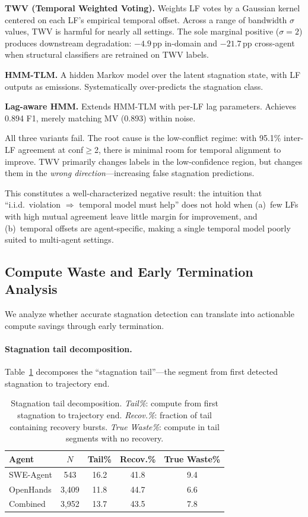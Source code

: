\documentclass[11pt,a4paper]{article}
\begin{document}
\textbf{TWV (Temporal Weighted Voting).} Weights LF votes by a Gaussian kernel centered on each LF's empirical temporal offset.
Across a range of bandwidth $\sigma$ values, TWV is harmful for nearly all settings.
The sole marginal positive ($\sigma{=}2$) produces downstream degradation: $-4.9$\,pp in-domain and $-21.7$\,pp cross-agent when structural classifiers are retrained on TWV labels.

\textbf{HMM-TLM.} A hidden Markov model over the latent stagnation state, with LF outputs as emissions.
Systematically over-predicts the stagnation class.

\textbf{Lag-aware HMM.} Extends HMM-TLM with per-LF lag parameters.
Achieves 0.894 F1, merely matching MV (0.893) within noise.

All three variants fail.
The root cause is the low-conflict regime: with 95.1\% inter-LF agreement at conf$\geq$2, there is minimal room for temporal alignment to improve.
TWV primarily changes labels in the low-confidence region, but changes them in the \emph{wrong direction}---increasing false stagnation predictions.

This constitutes a well-characterized negative result: the intuition that ``i.i.d.\ violation $\Rightarrow$ temporal model must help'' does not hold when (a)~few LFs with high mutual agreement leave little margin for improvement, and (b)~temporal offsets are agent-specific, making a single temporal model poorly suited to multi-agent settings.

\subsection{Compute Waste and Early Termination Analysis}
\label{sec:exp-intervention}

We analyze whether accurate stagnation detection can translate into actionable compute savings through early termination.

\paragraph{Stagnation tail decomposition.}
Table~\ref{tab:waste} decomposes the ``stagnation tail''---the segment from first detected stagnation to trajectory end.

\begin{table}[t]
\centering
\small
\begin{tabular}{lcccc}
\toprule
\textbf{Agent} & \textbf{$N$} & \textbf{Tail\%} & \textbf{Recov.\%} & \textbf{True Waste\%} \\
\midrule
SWE-Agent & 543 & 16.2 & 41.8 & 9.4 \\
OpenHands & 3{,}409 & 11.8 & 44.7 & 6.6 \\
Combined & 3{,}952 & 13.7 & 43.5 & 7.8 \\
\bottomrule
\end{tabular}
\caption{Stagnation tail decomposition. \emph{Tail\%}: compute from first stagnation to trajectory end. \emph{Recov.\%}: fraction of tail containing recovery bursts. \emph{True Waste\%}: compute in tail segments with no recovery.}
\label{tab:waste}
\end{table}
\end{document}
